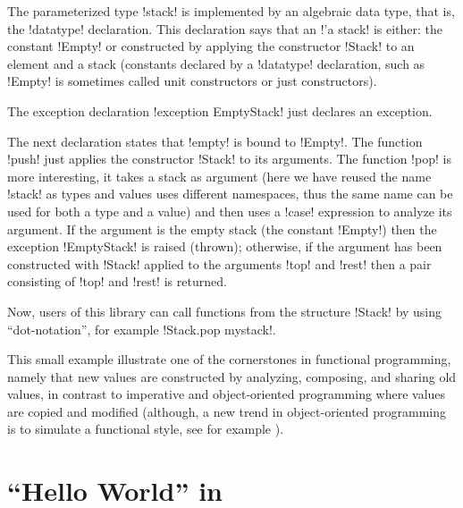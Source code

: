\documentclass[workingdraft]{usetex-v1}
\begin{document}
The parameterized type !stack! is implemented by an algebraic data
type, that is, the !datatype! declaration.  This declaration says that
an !'a stack! is either: the constant !Empty! or constructed by
applying the constructor !Stack! to an element and a stack (constants
declared by a !datatype! declaration, such as !Empty!  is sometimes
called unit constructors or just constructors).

The exception declaration !exception EmptyStack! just declares an
exception.

The next declaration states that !empty! is bound to !Empty!.  The
function !push! just applies the constructor !Stack! to its arguments.
The function !pop! is more interesting, it takes a stack as argument
(here we have reused the name !stack! as types and values uses
different namespaces, thus the same name can be used for both a type
and a value) and then uses a !case! expression to analyze its argument.
If the argument is the empty stack (the constant !Empty!) then the
exception !EmptyStack! is raised (thrown); otherwise, if the argument
has been constructed with !Stack! applied to the arguments !top! and
!rest! then a pair consisting of !top! and !rest! is returned.

Now, users of this library can call functions from the structure
!Stack! by using ``dot-notation'', for example !Stack.pop mystack!.

This small example illustrate one of the cornerstones in functional
programming, namely that new values are constructed by analyzing,
composing, and sharing old values, in contrast to imperative and
object-oriented programming where values are copied and modified
(although, a new trend in object-oriented programming is to simulate a
functional style, see for example \cite[Item 13 and
14]{bloch01:effective-java}).










\section{``Hello World'' in \mgtk}
\label{sec:example}
\end{document}
